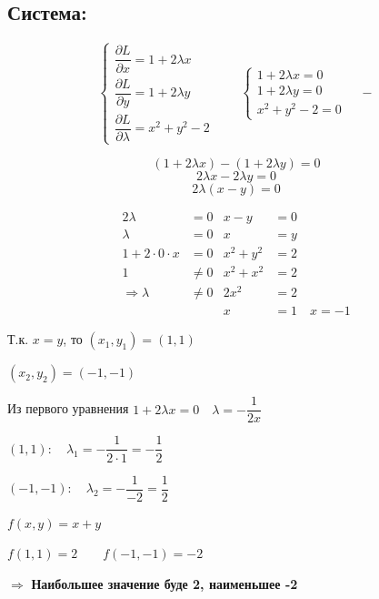 \documentclass[12pt, a4paper]{article}
\begin{document}
\begin{enumerate}
    \subsection*{Система:}
    \[
    \begin{cases}
    \dfrac{\partial L}{\partial x} = 1 + 2\lambda x \\
    \dfrac{\partial L}{\partial y} = 1 + 2\lambda y \\
    \dfrac{\partial L}{\partial \lambda} = x^2 + y^2 - 2
    \end{cases}
    \qquad
    \begin{cases}
    1 + 2\lambda x = 0 \\
    1 + 2\lambda y = 0 \\
    x^2 + y^2 - 2 = 0
    \end{cases} \quad -
    \]
\end{enumerate}

\newpage

\[
(1 + 2\lambda x) - (1 + 2\lambda y) = 0
\]
\[
2\lambda x - 2\lambda y = 0
\]
\[
2\lambda(x - y) = 0
\]

\begin{align*}
2\lambda &= 0 & x - y &= 0 \\
\lambda &= 0 & x &= y \\
1 + 2 \cdot 0 \cdot x &= 0 & x^2 + y^2 &= 2 \\
1 &\neq 0 & x^2 + x^2 &= 2 \\
\Rightarrow \lambda &\neq 0 & 2x^2 &= 2 \\
& & x &= 1 \quad x = -1
\end{align*}

Т.к. $x = y$, то $(x_1, y_1) = (1, 1)$

$(x_2, y_2) = (-1, -1)$

Из первого уравнения $1 + 2\lambda x = 0 \quad \lambda = -\dfrac{1}{2x}$

$(1, 1) : \quad \lambda_1 = -\dfrac{1}{2 \cdot 1} = -\dfrac{1}{2}$

$(-1, -1) : \quad \lambda_2 = -\dfrac{1}{-2} = \dfrac{1}{2}$

$f(x,y) = x + y$

$f(1, 1) = 2 \qquad f(-1, -1) = -2$

$\Rightarrow$ \textbf{Наибольшее значение буде 2, наименьшее -2}
\end{document}

